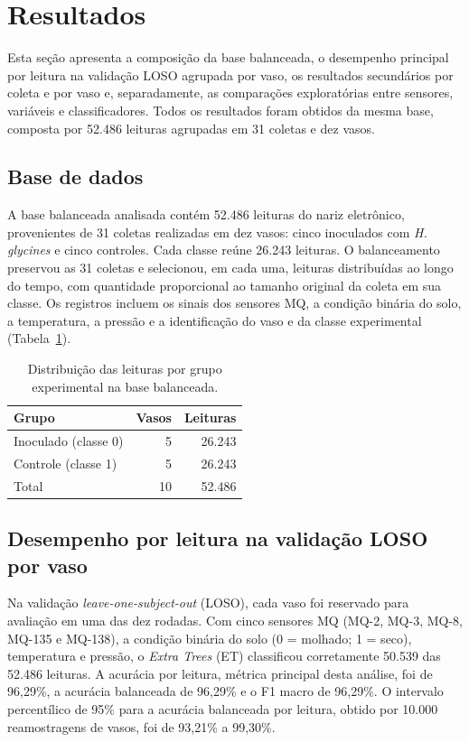 \section{Resultados}
\label{results}

Esta seção apresenta a composição da base balanceada, o desempenho principal por leitura na validação LOSO agrupada por vaso, os resultados secundários por coleta e por vaso e, separadamente, as comparações exploratórias entre sensores, variáveis e classificadores. Todos os resultados foram obtidos da mesma base, composta por 52.486 leituras agrupadas em 31 coletas e dez vasos.

\subsection{Base de dados}
\label{subsec:res_base}

A base balanceada analisada contém 52.486 leituras do nariz eletrônico, provenientes de 31 coletas realizadas em dez vasos: cinco inoculados com \textit{H. glycines} e cinco controles. Cada classe reúne 26.243 leituras. O balanceamento preservou as 31 coletas e selecionou, em cada uma, leituras distribuídas ao longo do tempo, com quantidade proporcional ao tamanho original da coleta em sua classe. Os registros incluem os sinais dos sensores MQ, a condição binária do solo, a temperatura, a pressão e a identificação do vaso e da classe experimental (Tabela~\ref{tab:base_dados}).

\begin{table}[H]
\centering
\footnotesize
\caption{Distribuição das leituras por grupo experimental na base balanceada.}
\label{tab:base_dados}
\begin{tabular}{lrr}
\toprule
Grupo & Vasos & Leituras \\
\midrule
Inoculado (classe 0) & 5 & 26.243 \\
Controle (classe 1) & 5 & 26.243 \\
\midrule
Total & 10 & 52.486 \\
\bottomrule
\end{tabular}
\end{table}

\subsection{Desempenho por leitura na validação LOSO por vaso}
\label{subsec:res_loso}

Na validação \textit{leave-one-subject-out} (LOSO), cada vaso foi reservado para avaliação em uma das dez rodadas. Com cinco sensores MQ (MQ-2, MQ-3, MQ-8, MQ-135 e MQ-138), a condição binária do solo (0 = molhado; 1 = seco), temperatura e pressão, o \textit{Extra Trees} (ET) classificou corretamente 50.539 das 52.486 leituras. A acurácia por leitura, métrica principal desta análise, foi de 96,29\%, a acurácia balanceada de 96,29\% e o F1 macro de 96,29\%. O intervalo percentílico de 95\% para a acurácia balanceada por leitura, obtido por 10.000 reamostragens de vasos, foi de 93,21\% a 99,30\%.


